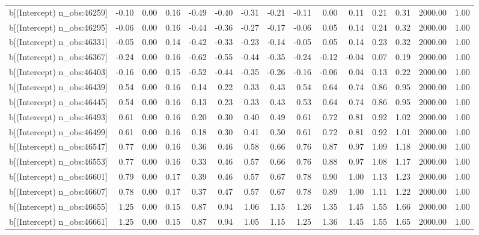 \begin{table}[ht]
\begin{tabular}{rrrrrrrrrrrrrrr}
  b[(Intercept) n\_obs:46259] & -0.10 & 0.00 & 0.16 & -0.49 & -0.40 & -0.31 & -0.21 & -0.11 & 0.00 & 0.11 & 0.21 & 0.31 & 2000.00 & 1.00 \\ 
  b[(Intercept) n\_obs:46295] & -0.06 & 0.00 & 0.16 & -0.44 & -0.36 & -0.27 & -0.17 & -0.06 & 0.05 & 0.14 & 0.24 & 0.32 & 2000.00 & 1.00 \\ 
  b[(Intercept) n\_obs:46331] & -0.05 & 0.00 & 0.14 & -0.42 & -0.33 & -0.23 & -0.14 & -0.05 & 0.05 & 0.14 & 0.23 & 0.32 & 2000.00 & 1.00 \\ 
  b[(Intercept) n\_obs:46367] & -0.24 & 0.00 & 0.16 & -0.62 & -0.55 & -0.44 & -0.35 & -0.24 & -0.12 & -0.04 & 0.07 & 0.19 & 2000.00 & 1.00 \\ 
  b[(Intercept) n\_obs:46403] & -0.16 & 0.00 & 0.15 & -0.52 & -0.44 & -0.35 & -0.26 & -0.16 & -0.06 & 0.04 & 0.13 & 0.22 & 2000.00 & 1.00 \\ 
  b[(Intercept) n\_obs:46439] & 0.54 & 0.00 & 0.16 & 0.14 & 0.22 & 0.33 & 0.43 & 0.54 & 0.64 & 0.74 & 0.86 & 0.95 & 2000.00 & 1.00 \\ 
  b[(Intercept) n\_obs:46445] & 0.54 & 0.00 & 0.16 & 0.13 & 0.23 & 0.33 & 0.43 & 0.53 & 0.64 & 0.74 & 0.86 & 0.95 & 2000.00 & 1.00 \\ 
  b[(Intercept) n\_obs:46493] & 0.61 & 0.00 & 0.16 & 0.20 & 0.30 & 0.40 & 0.49 & 0.61 & 0.72 & 0.81 & 0.92 & 1.02 & 2000.00 & 1.00 \\ 
  b[(Intercept) n\_obs:46499] & 0.61 & 0.00 & 0.16 & 0.18 & 0.30 & 0.41 & 0.50 & 0.61 & 0.72 & 0.81 & 0.92 & 1.01 & 2000.00 & 1.00 \\ 
  b[(Intercept) n\_obs:46547] & 0.77 & 0.00 & 0.16 & 0.36 & 0.46 & 0.58 & 0.66 & 0.76 & 0.87 & 0.97 & 1.09 & 1.18 & 2000.00 & 1.00 \\ 
  b[(Intercept) n\_obs:46553] & 0.77 & 0.00 & 0.16 & 0.33 & 0.46 & 0.57 & 0.66 & 0.76 & 0.88 & 0.97 & 1.08 & 1.17 & 2000.00 & 1.00 \\ 
  b[(Intercept) n\_obs:46601] & 0.79 & 0.00 & 0.17 & 0.39 & 0.46 & 0.57 & 0.67 & 0.78 & 0.90 & 1.00 & 1.13 & 1.23 & 2000.00 & 1.00 \\ 
  b[(Intercept) n\_obs:46607] & 0.78 & 0.00 & 0.17 & 0.37 & 0.47 & 0.57 & 0.67 & 0.78 & 0.89 & 1.00 & 1.11 & 1.22 & 2000.00 & 1.00 \\ 
  b[(Intercept) n\_obs:46655] & 1.25 & 0.00 & 0.15 & 0.87 & 0.94 & 1.06 & 1.15 & 1.26 & 1.35 & 1.45 & 1.55 & 1.66 & 2000.00 & 1.00 \\ 
  b[(Intercept) n\_obs:46661] & 1.25 & 0.00 & 0.15 & 0.87 & 0.94 & 1.05 & 1.15 & 1.25 & 1.36 & 1.45 & 1.55 & 1.65 & 2000.00 & 1.00 \\ 

\end{tabular}
\end{table}
